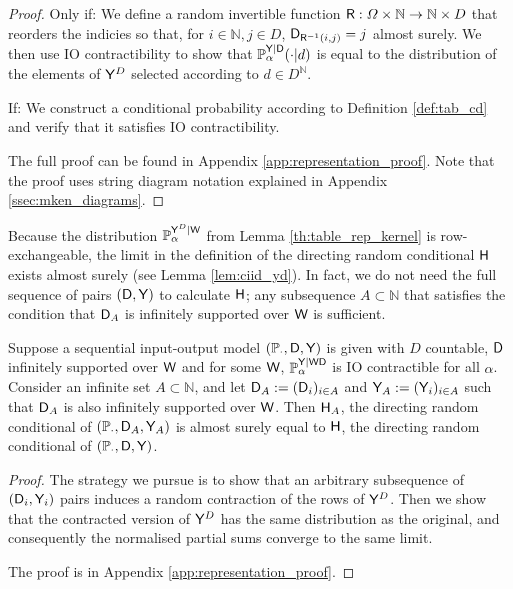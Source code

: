 \begin{proof}
Only if: We define a random invertible function $\mathsf{R}:\Omega\times \mathbb{N}\to \mathbb{N}\times {D}$ that reorders the indicies so that, for $i\in \mathbb{N},j\in D$, $\mathsf{D}_{\mathsf{R}^{-1}(i,j)}=j$ almost surely. We then use IO contractibility to show that $\mathbb{P}_\alpha^{\mathsf{Y}|\mathsf{D}}(\cdot|d)$ is equal to the distribution of the elements of $\mathsf{Y}^D$ selected according to $d\in D^{\mathbb{N}}$.

If: We construct a conditional probability according to Definition \ref{def:tab_cd} and verify that it satisfies IO contractibility.

The full proof can be found in Appendix \ref{app:representation_proof}. Note that the proof uses string diagram notation explained in Appendix \ref{ssec:mken_diagrams}.
\end{proof}

Because the distribution $\mathbb{P}_\alpha^{\mathsf{Y}^D|\mathsf{W}}$ from Lemma \ref{th:table_rep_kernel} is row-exchangeable, the limit in the definition of the directing random conditional $\mathsf{H}$ exists almost surely (see Lemma \ref{lem:ciid_yd}).  In fact, we do not need the full sequence of pairs $(\mathsf{D},\mathsf{Y})$ to calculate $\mathsf{H}$; any subsequence $A\subset\mathbb{N}$ that satisfies the condition that $\mathsf{D}_A$ is infinitely supported over $\mathsf{W}$ is sufficient.

\begin{theorem}\label{th:any_infinite_sequence}
Suppose a sequential input-output model $(\mathbb{P}_\cdot,\mathsf{D},\mathsf{Y})$ is given with $D$ countable,  $\mathsf{D}$ infinitely supported over $\mathsf{W}$ and for some $\mathsf{W}$, $\mathbb{P}_\alpha^{\mathsf{Y}|\mathsf{WD}}$ is IO contractible for all $\alpha$. Consider an infinite set $A\subset \mathbb{N}$, and let $\mathsf{D}_A:=(\mathsf{D}_i)_{i\in A}$ and $\mathsf{Y}_A:=(\mathsf{Y}_i)_{i\in A}$ such that $\mathsf{D}_A$ is also infinitely supported over $\mathsf{W}$. Then $\mathsf{H}_A$, the directing random conditional of $(\mathbb{P}_\cdot,\mathsf{D}_A,\mathsf{Y}_A)$ is almost surely equal to $\mathsf{H}$, the directing random conditional of $(\mathbb{P}_\cdot,\mathsf{D},\mathsf{Y})$.
\end{theorem}

\begin{proof}
The strategy we pursue is to show that an arbitrary subsequence of $(\mathsf{D}_i,\mathsf{Y}_i)$ pairs induces a random contraction of the rows of $\mathsf{Y}^D$. Then we show that the contracted version of $\mathsf{Y}^D$ has the same distribution as the original, and consequently the normalised partial sums converge to the same limit.

The proof is in Appendix \ref{app:representation_proof}.
\end{proof}

